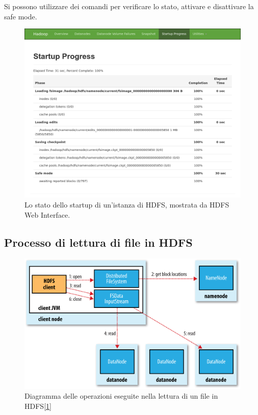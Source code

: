 \documentclass[italian,a4paper, twoside, 12pt]{report}
\newenvironment{Shaded}{}{}
\newcommand{\ExtensionTok}[1]{#1}
\newcommand{\NormalTok}[1]{#1}
\begin{document}
Si possono utilizzare dei comandi per verificare lo stato, attivare e
disattivare la safe mode.

\begin{Shaded}
\end{Shaded}

\begin{figure}
\centering
\includegraphics{img/hdfs-web-startup.png}
\caption{Lo stato dello startup di un'istanza di HDFS, mostrata da HDFS
Web Interface.}
\end{figure}

\subsection{Processo di lettura di file in
HDFS}\label{processo-di-lettura-di-file-in-hdfs}

\begin{figure}
\centering
\includegraphics{img/hdfs-file-read.png}
\caption{Diagramma delle operazioni eseguite nella lettura di un file in
HDFS{[}\protect\hyperlink{ref-hadoop-guide-hdfs-file-read}{1}{]}}
\end{figure}
\end{document}
